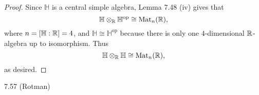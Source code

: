 \documentclass{article}
\begin{document}
\begin{proof}
  Since $\mathbb H$ is a central simple algebra, Lemma 7.48 (iv) gives that \[
    \mathbb H \otimes_\mathbb R \mathbb H^\text{op} \cong \operatorname{Mat}_n(\mathbb R),
  \] where $n = [\mathbb H : \mathbb R] = 4$, and $\mathbb H \cong \mathbb H^\text{op}$
  because there is only one $4$-dimensional $\mathbb R$-algebra up to isomorphism.
  Thus \[
    \mathbb H \otimes_\mathbb R \mathbb H \cong \operatorname{Mat}_n(\mathbb R),
  \] as desired.
\end{proof}
\pagebreak
\begin{problem}{7.57 (Rotman)} %
\end{problem}
\end{document}
